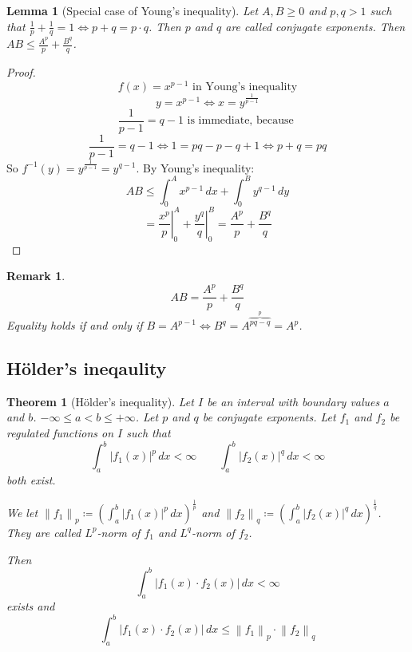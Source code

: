 \documentclass{article}
\newtheorem{theorem}{Theorem}  \numberwithin{theorem}{section}
\newtheorem{lemma}{Lemma}  \numberwithin{lemma}{section}
\newtheorem{remark}{Remark}  \numberwithin{remark}{section}
\newcommand{\norm}[1]{\left\|#1\right\|}
\newcommand{\card}[1]{\left|#1\right|}
\begin{document}
\begin{lemma}[Special case of Young's inequality] %
  \label{lemma14}
  Let $A, B \geq 0$ and $p,q > 1$ such that $\frac1p + \frac1q = 1 \iff p + q = p \cdot q$.
  Then $p$ and $q$ are called \emph{conjugate exponents}.
  Then $AB \leq \frac{A^p}{p} + \frac{B^q}{q}$.
\end{lemma}
\begin{proof}
  \[ f(x) = x^{p-1} \text{ in Young's inequality} \]
  \[ y = x^{p-1} \iff x = y^{\frac{1}{p-1}} \]
  \[ \frac{1}{p-1} = q - 1 \text{ is immediate, because } \]
  \[ \frac{1}{p-1} = q - 1 \iff 1 = pq - p - q + 1 \iff p + q = pq \]
  So $f^{-1}(y) = y^{\frac{1}{p-1}} = y^{q - 1}$.
  By Young's inequality:
  \[ AB \leq \int_0^A x^{p-1} \, dx + \int_0^B y^{q - 1} \, dy \]
  \[ = \left.\frac{x^p}{p}\right|_0^A + \left. \frac{y^q}{q} \right|_0^B = \frac{A^p}{p} + \frac{B^q}{q} \]
\end{proof}

\begin{remark}
  \[ AB = \frac{A^p}{p} + \frac{B^q}{q} \]
  Equality holds if and only if $B = A^{p-1} \iff B^q = A^{\overbrace{pq-q}^{p}} = A^p$.
\end{remark}

\subsection{H\"older's ineqaulity}

\begin{theorem}[H\"older's inequality] %
  Let $I$ be an interval with boundary values $a$ and $b$. $-\infty \leq a < b \leq +\infty$.
  Let $p$ and $q$ be conjugate exponents. Let $f_1$ and $f_2$ be regulated functions on $I$
  such that
  \[ \int_a^b \card{f_1(x)}^p \, dx < \infty \qquad \int_a^b \card{f_2(x)}^q \, dx < \infty \]
  both exist.

  We let $\norm{f_1}_p \coloneqq \left(\int_a^b \card{f_1(x)}^p \, dx\right)^{\frac1p}$ and $\norm{f_2}_q \coloneqq \left(\int_a^b \card{f_2(x)}^q \, dx\right)^{\frac1q}$.
  They are called $L^p$-norm of $f_1$ and $L^q$-norm of $f_2$.

  Then
  \[ \int_a^b \card{f_1(x) \cdot f_2(x)} \, dx < \infty \]
  exists and
  \[ \int_a^b \card{f_1(x) \cdot f_2(x)} \, dx \leq \norm{f_1}_p \cdot \norm{f_2}_q \]
\end{theorem}
\end{document}
